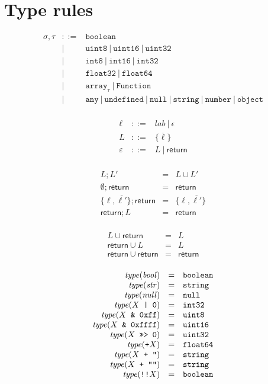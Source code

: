\documentclass{article}
\newcommand{\type}{\mathit{type}}
\newcommand{\seq}[1]{\overline{{#1}}}
\newcommand{\mathjs}[1]{\mbox{\texttt{{#1}}}}
\newcommand{\boolean}{\mathtt{boolean}}
\newcommand{\uintone}{\mathtt{uint8}}
\newcommand{\uinttwo}{\mathtt{uint16}}
\newcommand{\uintfour}{\mathtt{uint32}}
\newcommand{\intone}{\mathtt{int8}}
\newcommand{\inttwo}{\mathtt{int16}}
\newcommand{\intfour}{\mathtt{int32}}
\newcommand{\float}{\mathtt{float32}}
\newcommand{\double}{\mathtt{float64}}
\newcommand{\arr}[1]{\mathtt{array}_{#1}}
\newcommand{\Fun}{\mathtt{Function}}
\newcommand{\any}{\mathtt{any}}
\newcommand{\str}{\mathtt{string}}
\newcommand{\undef}{\mathtt{undefined}}
\newcommand{\nul}{\mathtt{null}}
\newcommand{\num}{\mathtt{number}}
\newcommand{\obj}{\mathtt{object}}
\newcommand{\mustret}{\mathsf{return}}
\newcommand{\seqcomp}{\mathrel{;}}
\begin{document}
\section{Type rules}

\[
\begin{array}{rcl}
\sigma, \tau & ::= & \boolean \\
             &  |  & \uintone ~|~ \uinttwo ~|~ \uintfour \\
             &  |  & \intone ~|~ \inttwo ~|~ \intfour \\
             &  |  & \float ~|~ \double \\
             &  |  & \arr{\tau} ~|~ \Fun \\
             &  |  & \any ~|~ \undef ~|~ \nul ~|~ \str ~|~ \num ~|~ \obj \\
\end{array}
\]

\[
\begin{array}{rcl}
\ell        & ::= & \mathit{lab} ~|~ \epsilon \\
L           & ::= & \{ \seq{\ell} \} \\
\varepsilon & ::= & L ~|~ \mustret \\
\end{array}
\]

\[
\begin{array}{rcl}
L                       \seqcomp L'       & = & L \cup L' \\
\emptyset               \seqcomp \mustret & = & \mustret \\
\{ \ell, \seq{\ell'} \} \seqcomp \mustret & = & \{ \ell, \seq{\ell'} \} \\
\mustret                \seqcomp L        & = & \mustret \\
\end{array}
\]

\[
\begin{array}{rcl}
L        \cup \mustret & = & L \\
\mustret \cup L        & = & L \\
\mustret \cup \mustret & = & \mustret \\
\end{array}
\]

\[
\begin{array}{rcl}
\type(\mathit{bool}) & = & \boolean \\
\type(\mathit{str}) & = & \str \\
\type(\mathit{null}) & = & \nul \\
\type(X \mathjs{ | 0}) & = & \intfour \\
\type(X \mathjs{ \& 0xff}) & = & \uintone \\
\type(X \mathjs{ \& 0xffff}) & = & \uinttwo \\
\type(X \mathjs{ >>> 0}) & = & \uintfour \\
\type(\mathjs{+}X) & = & \double \\
\type(X \mathjs{ + ''}) & = & \str \\
\type(X \mathjs{ + ""}) & = & \str \\
\type(\mathjs{!!}X) & = & \boolean \\
\end{array}
\]
\end{document}

